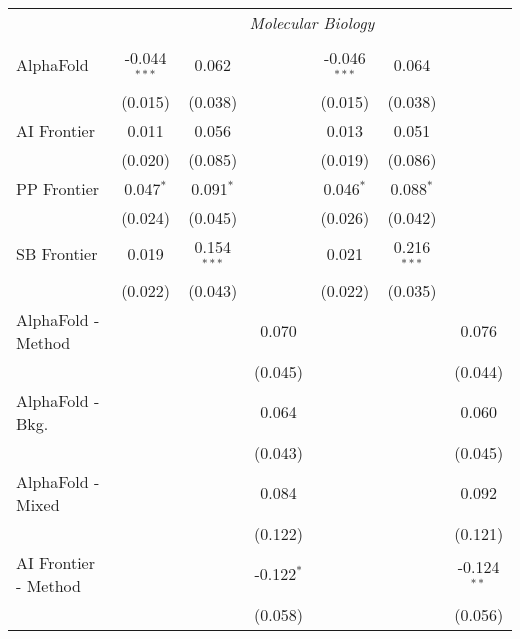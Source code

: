 \begin{tabular}{lcccccc}
 & \multicolumn{6}{c}{\textit{Molecular Biology}} \\ \\
   AlphaFold            & -0.044$^{***}$ & 0.062         &               & -0.046$^{***}$ & 0.064         &   \\   
                        & (0.015)        & (0.038)       &               & (0.015)        & (0.038)       &   \\   
   AI Frontier          & 0.011          & 0.056         &               & 0.013          & 0.051         &   \\   
                        & (0.020)        & (0.085)       &               & (0.019)        & (0.086)       &   \\   
   PP Frontier          & 0.047$^{*}$    & 0.091$^{*}$   &               & 0.046$^{*}$    & 0.088$^{*}$   &   \\   
                        & (0.024)        & (0.045)       &               & (0.026)        & (0.042)       &   \\   
   SB Frontier          & 0.019          & 0.154$^{***}$ &               & 0.021          & 0.216$^{***}$ &   \\   
                        & (0.022)        & (0.043)       &               & (0.022)        & (0.035)       &   \\   
   AlphaFold - Method   &                &               & 0.070         &                &               & 0.076\\   
                        &                &               & (0.045)       &                &               & (0.044)\\   
   AlphaFold - Bkg.     &                &               & 0.064         &                &               & 0.060\\   
                        &                &               & (0.043)       &                &               & (0.045)\\   
   AlphaFold - Mixed    &                &               & 0.084         &                &               & 0.092\\   
                        &                &               & (0.122)       &                &               & (0.121)\\   
   AI Frontier - Method &                &               & -0.122$^{*}$  &                &               & -0.124$^{**}$\\   
                        &                &               & (0.058)       &                &               & (0.056)\\   

\end{tabular}
